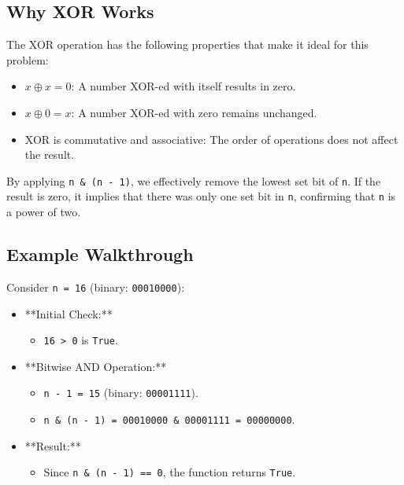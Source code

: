 \subsection*{Why XOR Works}

The XOR operation has the following properties that make it ideal for this problem:
\begin{itemize}
    \item \(x \oplus x = 0\): A number XOR-ed with itself results in zero.
    \item \(x \oplus 0 = x\): A number XOR-ed with zero remains unchanged.
    \item XOR is commutative and associative: The order of operations does not affect the result.
\end{itemize}

By applying \texttt{n \& (n - 1)}, we effectively remove the lowest set bit of \texttt{n}. If the result is zero, it implies that there was only one set bit in \texttt{n}, confirming that \texttt{n} is a power of two.

\subsection*{Example Walkthrough}

Consider \texttt{n = 16} (binary: \texttt{00010000}):

\begin{itemize}
    \item **Initial Check:**
    \begin{itemize}
        \item \texttt{16 > 0} is \texttt{True}.
    \end{itemize}
    
    \item **Bitwise AND Operation:**
    \begin{itemize}
        \item \texttt{n - 1 = 15} (binary: \texttt{00001111}).
        \item \texttt{n \& (n - 1) = 00010000 \& 00001111 = 00000000}.
    \end{itemize}
    
    \item **Result:**
    \begin{itemize}
        \item Since \texttt{n \& (n - 1) == 0}, the function returns \texttt{True}.
    \end{itemize}
\end{itemize}

